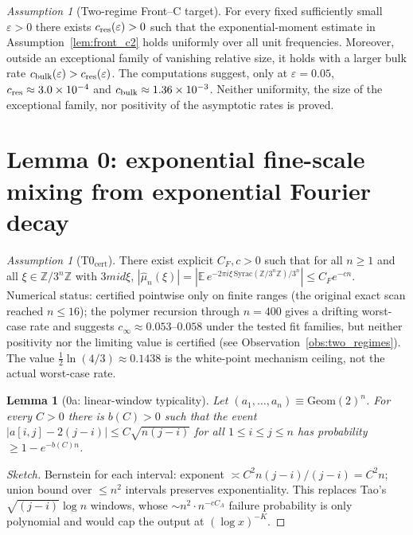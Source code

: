 \documentclass[12pt,a4paper]{article}
\newtheorem{lemma}[theorem]{Lemma}
\theoremstyle{remark}
\newtheorem{assumption}[theorem]{Assumption}
\begin{document}
\begin{assumption}[Two-regime Front--C target]
\label{ass:two_regime_front_c}
For every fixed sufficiently small $\varepsilon>0$ there exists
$c_{\rm res}(\varepsilon)>0$ such that the exponential-moment estimate in
Assumption~\ref{lem:front_c2} holds uniformly over all unit frequencies.
Moreover, outside an exceptional family of vanishing relative size, it holds
with a larger bulk rate $c_{\rm bulk}(\varepsilon)>c_{\rm res}(\varepsilon)$.
The computations suggest, only at $\varepsilon=0.05$,
$c_{\rm res}\approx3.0\times10^{-4}$ and
$c_{\rm bulk}\approx1.36\times10^{-3}$.  Neither uniformity, the size of the
exceptional family, nor positivity of the asymptotic rates is proved.
\end{assumption}

\section*{Lemma 0: exponential fine-scale mixing from exponential Fourier decay}
\begin{assumption}[T0$_{\mathrm{cert}}$]
There exist explicit $C_F,c>0$ such that for all $n\ge1$ and all
$\xi\in\mathbb Z/3^n\mathbb Z$ with $3
mid\xi$,
$|\hat\mu_n(\xi)|=|\mathbb E\,e^{-2\pi i\xi\,\mathrm{Syrac}(\mathbb Z/3^n\mathbb Z)/3^n}|
\le C_Fe^{-cn}$.
Numerical status: certified pointwise only on finite ranges (the original exact
scan reached $n\le16$); the polymer recursion through $n=400$ gives a drifting
worst-case rate and suggests $c_\infty\approx0.053$--$0.058$ under the tested
fit families, but neither positivity nor the limiting value is certified (see
Observation~\ref{obs:two_regimes}).  The value
$\tfrac12\ln(4/3)\approx0.1438$ is the white-point mechanism ceiling, not the
actual worst-case rate.
\end{assumption}
\begin{lemma}[0a: linear-window typicality]
Let $(a_1,\dots,a_n)\equiv\mathrm{Geom}(2)^n$. For every $C>0$ there is
$b(C)>0$ such that the event
$|a[i,j]-2(j-i)|\le C\sqrt{n(j-i)}$ for all $1\le i\le j\le n$
has probability $\ge1-e^{-b(C)n}$.
\end{lemma}
\begin{proof}[Sketch] Bernstein for each interval: exponent
$\asymp C^2n(j-i)/(j-i)=C^2n$; union bound over $\le n^2$ intervals
preserves exponentiality. This replaces Tao's $\sqrt{(j-i)}\log n$ windows,
whose $\sim n^2\cdot n^{-cC_A}$ failure probability is only polynomial and
would cap the output at $(\log x)^{-K}$.
\end{proof}
\end{document}
